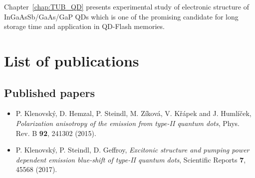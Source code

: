 \documentclass[
a4paper, %
11pt, %
onecolumn, %
openany, %
oldfontcommands,
]{memoir}
\begin{document}
Chapter~\ref{chap:TUB_QD} presents experimental study of electronic structure of InGaAsSb/GaAs/GaP QDs which is one of the promising candidate for long storage time and application in QD-Flash memories.   
\newpage 




\mainmatter

%





\appendix






%







\backmatter



%
%
%





%
\chapter{List of publications}\label{chap:publications}

\section*{Published papers}
\begin{itemize}
	\item P. Klenovský, D. Hemzal, P. Steindl, M. Zíková, V. Křápek and J. Humlíček, \textit{Polarization anisotropy of the emission from type-II quantum dots}, Phys. Rev. B \textbf{92}, 241302 (2015).
	\item P. Klenovský, P. Steindl, D. Geffroy, \textit{Excitonic structure and pumping power dependent emission blue-shift of type-II quantum dots}, Scientific Reports \textbf{7}, 45568 (2017).
\end{itemize}
\end{document}
